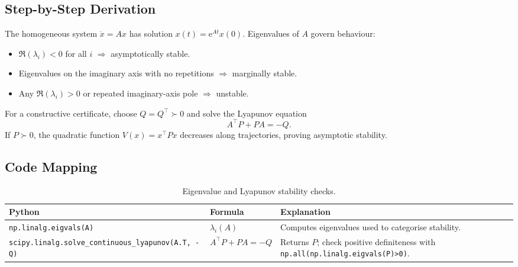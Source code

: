 \subsection{Step-by-Step Derivation}
The homogeneous system $\dot{x} = A x$ has solution $x(t) = \mathrm{e}^{A t} x(0)$. Eigenvalues of $A$ govern behaviour:
\begin{itemize}[leftmargin=*]
    \item $\Re(\lambda_i) < 0$ for all $i$ $\Rightarrow$ asymptotically stable.
    \item Eigenvalues on the imaginary axis with no repetitions $\Rightarrow$ marginally stable.
    \item Any $\Re(\lambda_i) > 0$ or repeated imaginary-axis pole $\Rightarrow$ unstable.
\end{itemize}
For a constructive certificate, choose $Q = Q^\top \succ 0$ and solve the Lyapunov equation
\[
    A^\top P + P A = -Q.
\]
If $P \succ 0$, the quadratic function $V(x) = x^\top P x$ decreases along trajectories, proving asymptotic stability.

\subsection{Code Mapping}
\begin{table}[h]
    \centering
    \small
    \renewcommand{\arraystretch}{1.2}
    \begin{tabularx}{\linewidth}{|>{\raggedright\arraybackslash}p{4cm}|X|X|}
        \hline
        \textbf{Python} & \textbf{Formula} & \textbf{Explanation} \\
        \hline
        \texttt{np.linalg.eigvals(A)} & $\lambda_i(A)$ & Computes eigenvalues used to categorise stability. \\
        \hline
        \texttt{scipy.linalg.solve\_continuous\_lyapunov(A.T, -Q)} & $A^\top P + P A = -Q$ & Returns $P$; check positive definiteness with \texttt{np.all(np.linalg.eigvals(P)>0)}. \\
        \hline
    \end{tabularx}
    \caption{Eigenvalue and Lyapunov stability checks.}
\end{table}

